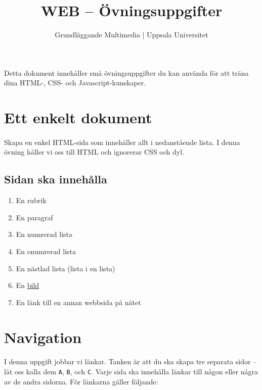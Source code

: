 \documentclass{article}
\begin{document}
  \title{ WEB -- Övningsuppgifter }
  \author{ Grundläggande Multimedia | Uppsala Universitet }
  \date{}
  \maketitle

  \paragraph{}
  Detta dokument innehåller små övningsuppgifter du kan använda för att träna dina HTML-, CSS- och Javascript-kunskaper.


  \newpage
  \section{ Ett enkelt dokument }
    \paragraph{}
    Skapa en enkel HTML-sida som innehåller allt i nedanstående lista. I denna övning håller vi oss till HTML och ignorerar CSS och dyl.

    \subsection*{Sidan ska innehålla}
      \begin{enumerate}
        \item En rubrik
        \item En paragraf
        \item En numrerad lista
        \item En onumrerad lista
        \item En nästlad lista (lista i en lista)
        \item En \href{https://www.google.se/search?q=kitten+meme&um=1&ie=UTF-8&hl=sv&tbm=isch&source=og&sa=N&tab=wi&ei=jUhAUt3YHYPYtAawqYGwDQ}{bild}
        \item En länk till en annan webbsida på nätet
      \end{enumerate}


  \newpage
  \section{ Navigation }
    \paragraph{}
    I denna uppgift jobbar vi länkar. Tanken är att du ska skapa tre separata sidor -- låt oss kalla dem \texttt{A}, \texttt{B}, och \texttt{C}. Varje sida ska innehålla länkar till någon eller några av de andra sidorna. För länkarna gäller följande:
\end{document}
